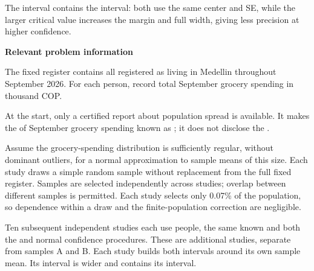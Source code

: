 The  interval contains the  interval: both use the same center and SE, while the larger critical value increases the margin and full width, giving less precision at higher confidence.

\secInicio[][sec:p1]

\clearpage



\textbf{Relevant problem information}

\begin{probleminfoexcerpt}
The fixed register contains all    registered as living in Medellin throughout September 2026. For each person, record total September grocery spending in thousand COP.
\end{probleminfoexcerpt}

\begin{probleminfoexcerpt}
At the start, only a certified report about population spread is available. It makes the    of September grocery spending known as   ; it does not disclose the  .
\end{probleminfoexcerpt}

\begin{probleminfoexcerpt}
Assume the grocery-spending distribution is sufficiently regular, without dominant outliers, for a normal approximation to sample means of this size. Each study draws a simple random sample without replacement from the full fixed register. Samples are selected independently across studies; overlap between different samples is permitted. Each study selects only 0.07\% of the population, so dependence within a draw and the finite-population correction are negligible.
\end{probleminfoexcerpt}

\begin{probleminfoexcerpt}
Ten subsequent independent studies each use  people, the same known  and both the  and  normal confidence procedures. These are additional studies, separate from samples A and B. Each study builds both intervals around its own sample mean. Its  interval is wider and contains its  interval.
\end{probleminfoexcerpt}


